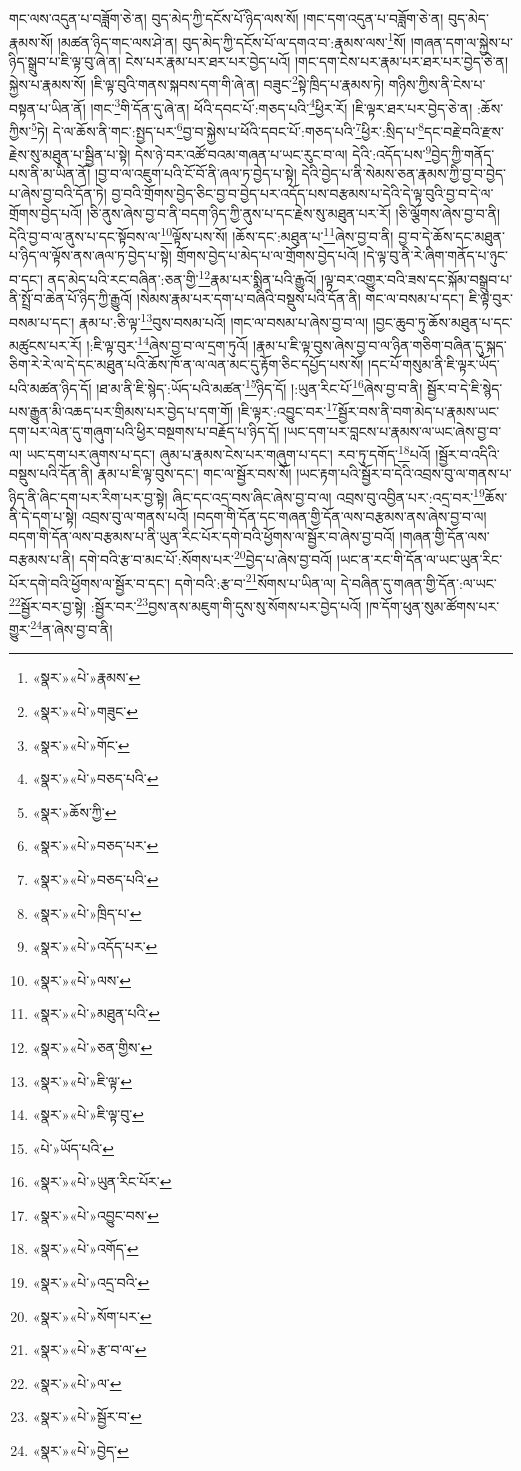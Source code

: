 གང་ལས་འདུན་པ་བཟློག་ཅེ་ན། བུད་མེད་ཀྱི་དངོས་པོ་ཉིད་ལས་སོ། །གང་དག་འདུན་པ་བཟློག་ཅེ་ན། བུད་མེད་རྣམས་སོ། །མཚན་ཉིད་གང་ལས་ཤེ་ན། བུད་མེད་ཀྱི་དངོས་པོ་ལ་དགའ་བ་:རྣམས་ལས་\footnote{«སྣར་»«པེ་»རྣམས་}སོ། །གཞན་དག་ལ་སྐྱེས་པ་ཉིད་སྒྲུབ་པ་ཇི་ལྟ་བུ་ཞེ་ན། ངེས་པར་རྣམ་པར་ཐར་པར་བྱེད་པའོ། །གང་དག་ངེས་པར་རྣམ་པར་ཐར་པར་བྱེད་ཅེ་ན། སྐྱེས་པ་རྣམས་སོ། །ཇི་ལྟ་བུའི་གནས་སྐབས་དག་གི་ཞེ་ན། བཟུང་\footnote{«སྣར་»«པེ་»གཟུང་}སྟེ་ཁྲིད་པ་རྣམས་ཏེ། གཉིས་ཀྱིས་ནི་ངེས་པ་བསྟན་པ་ཡིན་ནོ། །གང་\footnote{«སྣར་»«པེ་»གོང་}གི་དོན་དུ་ཞེ་ན། ཕོའི་དབང་པོ་:གཅད་པའི་\footnote{«སྣར་»«པེ་»བཅད་པའི་}ཕྱིར་རོ། །ཇི་ལྟར་ཐར་པར་བྱེད་ཅེ་ན། :ཆོས་ཀྱིས་\footnote{«སྣར་»ཆོས་ཀྱི་}ཏེ། དེ་ལ་ཆོས་ནི་གང་:སྤྱད་པར་\footnote{«སྣར་»«པེ་»བཅད་པར་}བྱ་བ་སྐྱེས་པ་ཕོའི་དབང་པོ་:གཅད་པའི་\footnote{«སྣར་»«པེ་»བཅད་པའི་}ཕྱིར་:སྲིད་པ་\footnote{«སྣར་»«པེ་»ཁྲིད་པ་}དང་བརྗེ་བའི་རྫས་རྗེས་སུ་མཐུན་པ་སྦྱིན་པ་སྟེ། དེས་ཉེ་བར་འཚོ་བའམ་གཞན་པ་ཡང་རུང་བ་ལ། དེའི་:འདོད་པས་\footnote{«སྣར་»«པེ་»འདོད་པར་}བྱེད་ཀྱི་གནོད་པས་ནི་མ་ཡིན་ནོ། །བྱ་བ་ལ་འཇུག་པའི་ངོ་བོ་ནི་ཞལ་ཏ་བྱེད་པ་སྟེ། དེའི་བྱེད་པ་ནི་སེམས་ཅན་རྣམས་ཀྱི་བྱ་བ་བྱེད་པ་ཞེས་བྱ་བའི་དོན་ཏེ། བྱ་བའི་གྲོགས་བྱེད་ཅིང་བྱ་བ་བྱེད་པར་འདོད་པས་བརྩམས་པ་དེའི་དེ་ལྟ་བུའི་བྱ་བ་དེ་ལ་གྲོགས་བྱེད་པའོ། །ཅི་ནུས་ཞེས་བྱ་བ་ནི་བདག་ཉིད་ཀྱི་ནུས་པ་དང་རྗེས་སུ་མཐུན་པར་རོ། །ཅི་ལྕོགས་ཞེས་བྱ་བ་ནི། དེའི་བྱ་བ་ལ་ནུས་པ་དང་སྟོབས་ལ་\footnote{«སྣར་»«པེ་»ལས་}ལྟོས་པས་སོ། །ཆོས་དང་:མཐུན་པ་\footnote{«སྣར་»«པེ་»མཐུན་པའི་}ཞེས་བྱ་བ་ནི། བྱ་བ་དེ་ཆོས་དང་མཐུན་པ་ཉིད་ལ་ལྟོས་ནས་ཞལ་ཏ་བྱེད་པ་སྟེ། གྲོགས་བྱེད་པ་མེད་པ་ལ་གྲོགས་བྱེད་པའོ། །དེ་ལྟ་བུ་ནི་རེ་ཞིག་གནོད་པ་ཉུང་བ་དང་། ནད་མེད་པའི་རང་བཞིན་:ཅན་གྱི་\footnote{«སྣར་»«པེ་»ཅན་གྱིས་}རྣམ་པར་སྨིན་པའི་རྒྱུའོ། །ལྟ་བར་འགྱུར་བའི་ཟས་དང་སྐོམ་བསྒྲུབ་པ་ནི་སྤྲོ་བ་ཆེན་པོ་ཉིད་ཀྱི་རྒྱུའོ། །སེམས་རྣམ་པར་དག་པ་བཞིའི་བསྡུས་པའི་དོན་ནི། གང་ལ་བསམ་པ་དང་། ཇི་ལྟ་བུར་བསམ་པ་དང་། རྣམ་པ་:ཅི་ལྟ་\footnote{«སྣར་»«པེ་»ཇི་ལྟ་}བུས་བསམ་པའོ། །གང་ལ་བསམ་པ་ཞེས་བྱ་བ་ལ། །བྱང་ཆུབ་ཏུ་ཆོས་མཐུན་པ་དང་མཚུངས་པར་རོ། །:ཇི་ལྟ་བུར་\footnote{«སྣར་»«པེ་»ཇི་ལྟ་བུ་}ཞེས་བྱ་བ་ལ་དྲག་ཏུའོ། །རྣམ་པ་ཇི་ལྟ་བུས་ཞེས་བྱ་བ་ལ་ཉིན་གཅིག་བཞིན་དུ་སྐད་ཅིག་རེ་རེ་ལ་དེ་དང་མཐུན་པའི་ཆོས་ཁོ་ན་ལ་ལན་མང་དུ་རྟོག་ཅིང་དཔྱོད་པས་སོ། །དང་པོ་གསུམ་ནི་ཇི་ལྟར་ཡོད་པའི་མཚན་ཉིད་དོ། །ཐ་མ་ནི་ཇི་སྙེད་:ཡོད་པའི་མཚན་\footnote{«པེ་»ཡོད་པའི་}ཉིད་དོ། །:ཡུན་རིང་པོ་\footnote{«སྣར་»«པེ་»ཡུན་རིང་པོར་}ཞེས་བྱ་བ་ནི། སྦྱོར་བ་དེ་ཇི་སྙེད་པས་རྒྱུན་མི་འཆད་པར་གྲིམས་པར་བྱེད་པ་དག་གོ། །ཇི་ལྟར་:འབྱུང་བར་\footnote{«སྣར་»«པེ་»འབྱུང་བས་}སྦྱོར་བས་ནི་བག་མེད་པ་རྣམས་ཡང་དག་པར་ལེན་དུ་གཞུག་པའི་ཕྱིར་བསྔགས་པ་བརྗོད་པ་ཉིད་དོ། །ཡང་དག་པར་བླངས་པ་རྣམས་ལ་ཡང་ཞེས་བྱ་བ་ལ། ཡང་དག་པར་ཞུགས་པ་དང་། ཞུམ་པ་རྣམས་ངེས་པར་གཞུག་པ་དང་། རབ་ཏུ་དགོད་\footnote{«སྣར་»«པེ་»འགོད་}པའོ། །སྦྱོར་བ་འདིའི་བསྡུས་པའི་དོན་ནི། རྣམ་པ་ཇི་ལྟ་བུས་དང་། གང་ལ་སྦྱོར་བས་སོ། །ཡང་རྟག་པའི་སྦྱོར་བ་དེའི་འབྲས་བུ་ལ་གནས་པ་ཉིད་ནི་ཞིང་དག་པར་རིག་པར་བྱ་སྟེ། ཞིང་དང་འདྲ་བས་ཞིང་ཞེས་བྱ་བ་ལ། འབྲས་བུ་འབྱིན་པར་:འདྲ་བར་\footnote{«སྣར་»«པེ་»འདྲ་བའི་}ཆོས་ནི་དེ་དག་པ་སྟེ། འབྲས་བུ་ལ་གནས་པའོ། །བདག་གི་དོན་དང་གཞན་གྱི་དོན་ལས་བརྩམས་ནས་ཞེས་བྱ་བ་ལ། བདག་གི་དོན་ལས་བརྩམས་པ་ནི་ཡུན་རིང་པོར་དགེ་བའི་ཕྱོགས་ལ་སྦྱོར་བ་ཞེས་བྱ་བའོ། །གཞན་གྱི་དོན་ལས་བརྩམས་པ་ནི། དགེ་བའི་རྩ་བ་མང་པོ་:སོགས་པར་\footnote{«སྣར་»«པེ་»སོག་པར་}བྱེད་པ་ཞེས་བྱ་བའོ། །ཡང་ན་རང་གི་དོན་ལ་ཡང་ཡུན་རིང་པོར་དགེ་བའི་ཕྱོགས་ལ་སྦྱོར་བ་དང་། དགེ་བའི་:རྩ་བ་\footnote{«སྣར་»«པེ་»རྩ་བ་ལ་}སོགས་པ་ཡིན་ལ། དེ་བཞིན་དུ་གཞན་གྱི་དོན་:ལ་ཡང་\footnote{«སྣར་»«པེ་»ལ་}སྦྱོར་བར་བྱ་སྟེ། :སྦྱོར་བར་\footnote{«སྣར་»«པེ་»སྦྱོར་བ་}བྱས་ནས་མཇུག་གི་དུས་སུ་སོགས་པར་བྱེད་པའོ། །ཁ་དོག་ཕུན་སུམ་ཚོགས་པར་གྱུར་\footnote{«སྣར་»«པེ་»བྱེད་}ན་ཞེས་བྱ་བ་ནི། 